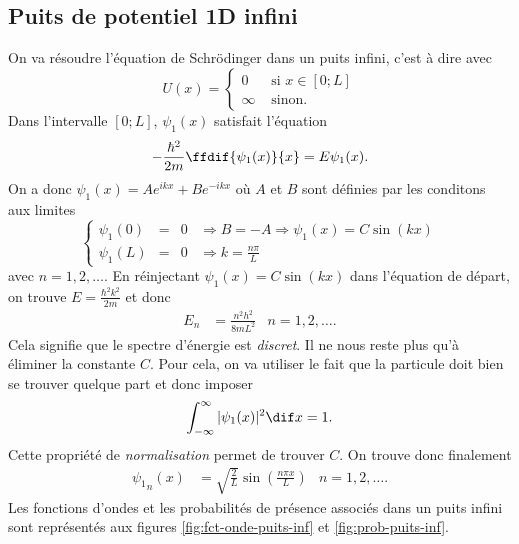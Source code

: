 \subsection{Puits de potentiel 1D infini}
\label{sec:puits-1d}
On va résoudre l'équation de Schrödinger dans un puits infini,
c'est à dire avec
\[ U(x) = \left\{
  \begin{aligned}
    0 & \text{ si } x \in [0; L]\\
    \infty & \text{ sinon}.
  \end{aligned}
\right. \]
Dans l'intervalle $[0; L]$, $\psi_1(x)$ satisfait
l'équation
\[ -\frac{\hbar^2}{2m}\ffdif{\psi_1(x)}{x} = E\psi_1(x).\]
On a donc $\psi_1(x) = Ae^{ikx}+Be^{-ikx}$ où $A$ et $B$
sont définies par les conditons aux limites
\[ \left\{
  \begin{aligned}
    \psi_1(0) &=& 0 & \Rightarrow B = -A \Rightarrow \psi_1(x) = C\sin(kx)\\
    \psi_1(L) &=& 0 & \Rightarrow k = \frac{n\pi}{L}
  \end{aligned}
\right. \]
avec $n = 1, 2, \ldots$. En réinjectant $\psi_1(x) = C\sin(kx)$
dans l'équation de départ, on trouve $E = \frac{\hbar^2k^2}{2m}$
et donc
\begin{align*}
  E_n & = \frac{n^2h^2}{8mL^2} & n = 1, 2, \ldots.
\end{align*}
Cela signifie que le spectre d'énergie est \emph{discret}.
Il ne nous reste plus qu'à éliminer la constante $C$.
Pour cela, on va utiliser le fait que la particule doit
bien se trouver quelque part et donc imposer
\[ \int_{-\infty}^{\infty} |\psi_1(x)|^2 \dif x = 1.\]
Cette propriété de \emph{normalisation} permet de trouver
$C$. On trouve donc finalement
\begin{align*}
  {\psi_1}_n(x) & =
  \sqrt{\frac{2}{L}}\sin\left(\frac{n\pi x}{L}\right) & n = 1, 2, \ldots.
\end{align*}
Les fonctions d'ondes et les probabilités de présence
associés dans un puits infini sont représentés aux figures
\ref{fig:fct-onde-puits-inf} et \ref{fig:prob-puits-inf}.

